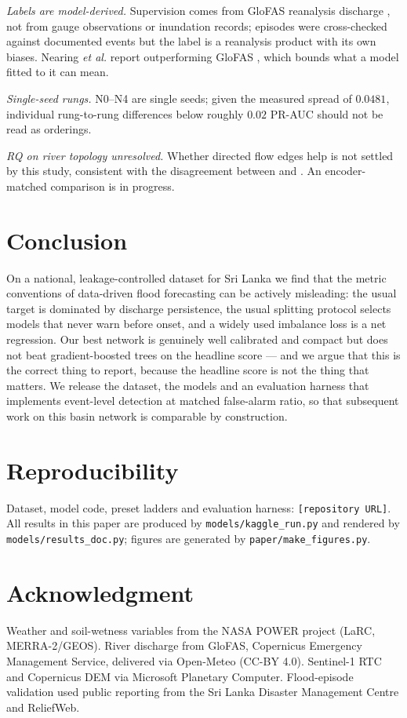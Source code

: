 \documentclass[conference]{IEEEtran}
\begin{document}
\emph{Labels are model-derived.} Supervision comes from GloFAS reanalysis
discharge \cite{harrigan2020}, not from gauge observations or inundation records;
episodes were cross-checked against documented events but the label is a
reanalysis product with its own biases. Nearing \emph{et al.} report outperforming
GloFAS \cite{nearing2024}, which bounds what a model fitted to it can mean.

\emph{Single-seed rungs.} N0--N4 are single seeds; given the measured spread of
$0.0481$, individual rung-to-rung differences below roughly $0.02$ PR-AUC should
not be read as orderings.

\emph{RQ on river topology unresolved.} Whether directed flow edges help is not
settled by this study, consistent with the disagreement between
\cite{kirschstein2024} and \cite{wang2025}. An encoder-matched comparison is in
progress.

\section{Conclusion}

On a national, leakage-controlled dataset for Sri Lanka we find that the metric
conventions of data-driven flood forecasting can be actively misleading: the
usual target is dominated by discharge persistence, the usual splitting protocol
selects models that never warn before onset, and a widely used imbalance loss is
a net regression. Our best network is genuinely well calibrated and compact but
does not beat gradient-boosted trees on the headline score --- and we argue that
this is the correct thing to report, because the headline score is not the thing
that matters. We release the dataset, the models and an evaluation harness that
implements event-level detection at matched false-alarm ratio, so that subsequent
work on this basin network is comparable by construction.

\section*{Reproducibility}
Dataset, model code, preset ladders and evaluation harness:
\texttt{[repository URL]}. All results in this paper are produced by
\texttt{models/kaggle\_run.py} and rendered by \texttt{models/results\_doc.py};
figures are generated by \texttt{paper/make\_figures.py}.

\section*{Acknowledgment}
Weather and soil-wetness variables from the NASA POWER project (LaRC,
MERRA-2/GEOS). River discharge from GloFAS, Copernicus Emergency Management
Service, delivered via Open-Meteo (CC-BY 4.0). Sentinel-1 RTC and Copernicus DEM
via Microsoft Planetary Computer. Flood-episode validation used public reporting
from the Sri Lanka Disaster Management Centre and ReliefWeb.
\end{document}
